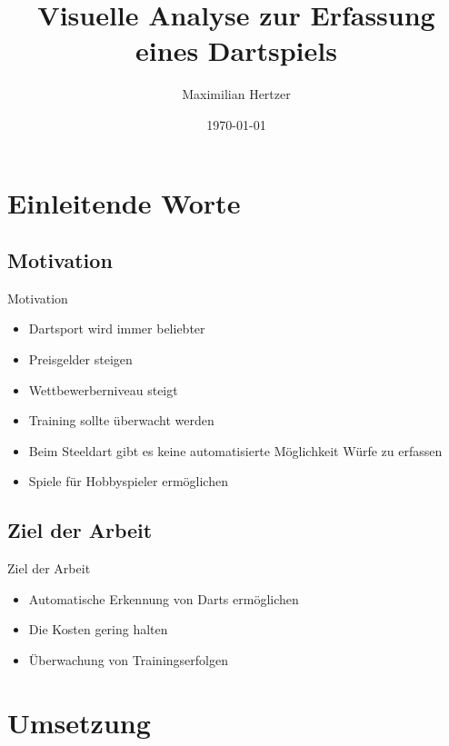\documentclass{beamer}
\begin{document}
\title{Visuelle Analyse zur Erfassung eines Dartspiels}  
\author{Maximilian Hertzer}
\date{\today} 

\frame{\titlepage} 



\section{Einleitende Worte} 
\subsection{Motivation}
\begin{frame}{Motivation} 
\begin{itemize}
\item Dartsport wird immer beliebter \pause
\item Preisgelder steigen \pause
\item Wettbewerberniveau steigt \pause
\item Training sollte überwacht werden \pause
\item Beim Steeldart gibt es keine automatisierte Möglichkeit Würfe zu erfassen
\item Spiele für Hobbyspieler ermöglichen
\end{itemize} 
\end{frame}

\subsection{Ziel der Arbeit }
\begin{frame}{Ziel der Arbeit} 
\begin{itemize}
\item Automatische Erkennung von Darts ermöglichen 
\item Die Kosten gering halten 
\item Überwachung von Trainingserfolgen
\end{itemize} 
\end{frame}


\section{Umsetzung} 
\end{document}
